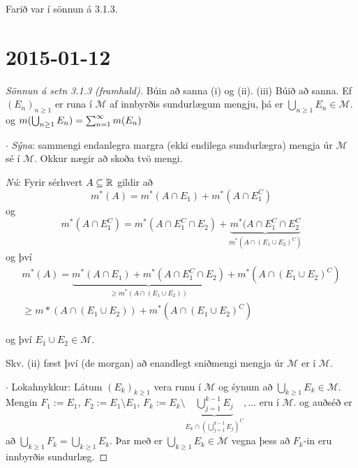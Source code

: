 \documentclass[12pt]{book}
\newcommand{\cM}{\mathcal{M}}
\begin{document}
Farið var í sönnun á 3.1.3.

\chapter{2015-01-12}

\begin{proof}[Sönnun á setn 3.1.3 (framhald)]
Búin að sanna (i) og (ii). (iii) Búið að sanna. Ef $(E_n)_{n \geq 1}$ er runa í $\cM$
af innbyrðis sundurlægum mengju, þá er $\bigcup_{n \geq 1} E_n \in \cM$.
og $m(\bigcup_{n \geq 1} E_n) = \sum_{n = 1}^{\infty} m (E_n)$

$\cdot$ \emph{Sýna}: sammengi endanlegra margra (ekki endilega sundurlægra) mengja úr $\cM$ sé í $\cM$.
Okkur nægir að skoða tvö mengi.

\emph{Nú}: Fyrir sérhvert $A \subseteq \mathbb{R}$
 gildir að \[m^*(A) = m^*(A \cap E_1) + m^*(A \cap E_1^C)\]
 og \[m^*(A \cap E_1^C)  = m^*(A \cap E_1^C \cap E_2) + \underbrace{m^*(A \cap E_1^C \cap E_2^C}_{m^*(A \cap (E_1 \cup E_2)^C)}\]
 og því
 \begin{gather*}
   m^*(A) = \underbrace{m^*(A \cap E_1) + m^*(A \cap E_1^C \cap
     E_2)}_{\geq m^*(A \cap (E_1 \cup E_2))} + m^*(A \cap (E_1 \cup E_2)^C)\\
    \geq m*(A \cap (E_1 \cup E_2)) + m^*(A \cap (E_1 \cup E_2)^C)
  \end{gather*}

  og því $E_1 \cup E_2 \in \cM$.

  Skv. (ii) fæst því (de morgan) að enandlegt sniðmengi mengja úr $\cM$ er í $\cM$.

  $\cdot$ Lokahnykkur: Látum $(E_k)_{k \geq 1}$ vera runu í $\cM$ og śynum að
  $\bigcup_{k \geq 1} E_k \in \cM$. Mengin $F_1 := E_1$, $F_2 := E_1 \setminus E_1$,
  $F_k := E_k \setminus \underbrace{\bigcup_{j=1}^{k-1} E_j}_{E_k \cap (\bigcup_{j=1}^{k-1} E_j)^C}, \dotsc$ eru í $\cM$.
  og auðséð er að $\bigcup_{k \geq 1} F_k = \bigcup_{k \geq 1} E_k$. Þar með
  er $\bigcup_{k \geq 1} E_k \in \cM$ vegna þess að $F_k$-in eru innbyrðis sundurlæg.
\end{proof}

 
\end{document}
